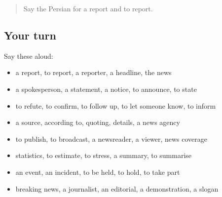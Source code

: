 \label{lesson:FA-R315-review-308-315}



\begin{quote}
Say the Persian for a report and to report.
\end{quote}

\subsection*{Your turn}
Say these aloud:

\begin{itemize}
\raggedright
  \item a report, to report, a reporter, a headline, the news
  \item a spokesperson, a statement, a notice, to announce, to state
  \item to refute, to confirm, to follow up, to let someone know, to inform
  \item a source, according to, quoting, details, a news agency
  \item to publish, to broadcast, a newsreader, a viewer, news coverage
  \item statistics, to estimate, to stress, a summary, to summarise
  \item an event, an incident, to be held, to hold, to take part
  \item breaking news, a journalist, an editorial, a demonstration, a slogan
\end{itemize}

